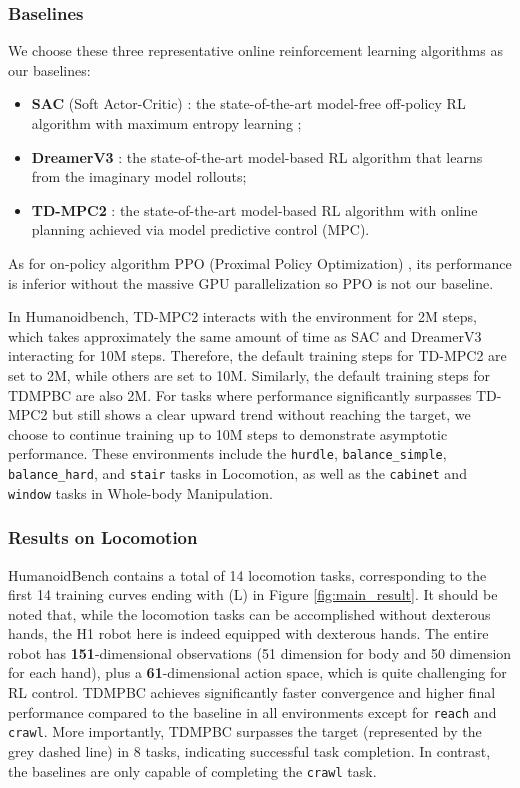 \subsubsection{Baselines}
We choose these three representative online reinforcement learning algorithms as our baselines:
\begin{itemize}[leftmargin=1.2em]
    \item \textbf{SAC} (Soft Actor-Critic) \citep{haarnoja2018soft}: the state-of-the-art model-free off-policy RL algorithm with maximum entropy learning \citep{eysenbach2021maximum};
    \item \textbf{DreamerV3} \citep{hafner2023mastering}: the state-of-the-art model-based RL algorithm that learns from the imaginary model rollouts;
    \item \textbf{TD-MPC2} \citep{hansen2023td}: the state-of-the-art model-based RL algorithm with online planning achieved via model predictive control (MPC).
\end{itemize}
As for on-policy algorithm PPO (Proximal Policy Optimization) \citep{schulman2017proximal}, its performance is inferior without the massive GPU parallelization so PPO is not our baseline.

In Humanoidbench, TD-MPC2 interacts with the environment for 2M steps, which takes approximately the same amount of time as SAC and DreamerV3 interacting for 10M steps. 
Therefore, the default training steps for TD-MPC2 are set to 2M, while others are set to 10M. 
Similarly, the default training steps for TDMPBC are also 2M.
For tasks where performance significantly surpasses TD-MPC2 but still shows a clear upward trend without reaching the target, we choose to continue training up to 10M steps to demonstrate asymptotic performance. 
These environments include the \texttt{hurdle}, \texttt{balance\_simple}, \texttt{balance\_hard}, and \texttt{stair} tasks in Locomotion, as well as the \texttt{cabinet} and \texttt{window} tasks in Whole-body Manipulation.

\subsubsection{Results on Locomotion} 
HumanoidBench contains a total of 14 locomotion tasks, corresponding to the first 14 training curves ending with (L) in Figure \ref{fig:main_result}. 
It should be noted that, while the locomotion tasks can be accomplished without dexterous hands, the H1 robot here is indeed equipped with dexterous hands. 
The entire robot has \textbf{151}-dimensional observations (51 dimension for body and 50 dimension for each hand), plus a \textbf{61}-dimensional action space, which is quite challenging for RL control.
TDMPBC achieves significantly faster convergence and higher final performance compared to the baseline in all environments except for \texttt{reach} and \texttt{crawl}.
More importantly, TDMPBC surpasses the target (represented by the grey dashed line) in 8 tasks, indicating successful task completion. 
In contrast, the baselines are only capable of completing the \texttt{crawl} task.


